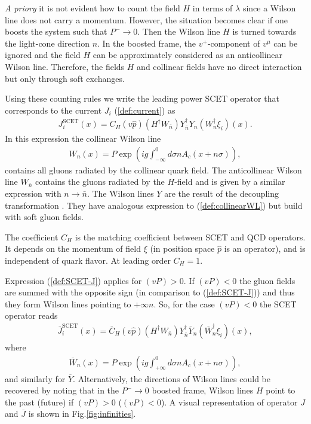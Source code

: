 \documentclass[a4paper, amsfonts, amssymb, amsmath, reprint, showkeys, nofootinbib, twoside]{revtex4-1}
\renewcommand{\(}{\left(}
\renewcommand{\)}{\right)}
\renewcommand{\[}{\left[}
\renewcommand{\]}{\right]}
\begin{document}
\textit{A priory} it is not evident how to count the field $H$ in terms of $\lambda$ since a Wilson line does not carry a momentum. However, the situation becomes clear if one boosts the system such that $P^-\to 0$. Then the Wilson line $H$ is turned towards the light-cone direction $n$. In the boosted frame, the $v^+$-component of $v^\mu$ can be ignored and the field $H$ can be approximately considered as an anticollinear Wilson line. Therefore, the fields $H$ and collinear fields have no direct interaction but only through soft exchanges.

Using these counting rules we write the leading power SCET operator that corresponds to the current $J_i$ (\ref{def:current}) as
\begin{eqnarray}\label{def:SCET-J}
J_i^{\text{SCET}}(x)=C_H(v\hat p)(H^\dagger W_{\bar n})Y^\dagger_{\bar n} Y_{n}(W_{n}^\dagger \xi_i)(x).
\end{eqnarray}
In this expression the collinear Wilson line
\begin{eqnarray}\label{def:collinearWL}
W_{n}(x)=P\exp\(ig \int_{-\infty}^0d\sigma n A_{c}(x+n \sigma)\),
\end{eqnarray}
contains all gluons radiated by the collinear quark field. The anticollinear Wilson line $W_{\bar n}$ contains the gluons radiated by the $H$-field and is given by a similar expression with $n\to \bar n$. The Wilson lines $Y$ are the result of the decoupling transformation \cite{Bauer:2001yt}. They have analogous expression to (\ref{def:collinearWL}) but build with soft gluon fields.


The coefficient $C_H$ is the matching coefficient between SCET and QCD operators. It depends on the momentum of field $\xi$ (in position space $\hat p$ is an operator), and is independent of quark flavor. At leading order $C_H=1$.

Expression (\ref{def:SCET-J}) applies for $(vP)>0$. If $(vP)<0$ the gluon fields are summed with the opposite sign (in comparison to (\ref{def:SCET-J})) and thus they form Wilson lines pointing to $+\infty n$. So, for the case $(vP)<0$ the SCET operator reads
\begin{eqnarray}\label{def:SCET-J:pv<0}
\overline{J}_i^{\text{SCET}}(x)=\overline{C}_H(v\hat p)(H^\dagger W_{\bar n})Y^\dagger_{\bar n} \overline{Y}_{n}(\overline{W}_{n}^\dagger \xi_i)(x),
\end{eqnarray}
where
\begin{eqnarray}\label{def:collinearWL-}
\overline{W}_{n}(x)=P\exp\(ig \int_{+\infty}^0d\sigma n A_{c}(x+n \sigma)\),
\end{eqnarray}
and similarly for $\overline{Y}$. Alternatively, the directions of Wilson lines could be recovered by noting that in the $P^-\to0$ boosted frame, Wilson lines $H$ point to the past (future) if $(vP)>0$ ($(vP)<0$). A visual representation of operator $J$ and $\overline{J}$ is shown in Fig.\ref{fig:infinities}.
\end{document}
